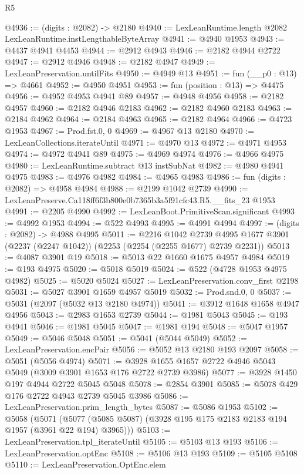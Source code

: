 \begin{lexlean}{R5}
\begin{coremodule}
@4936 := (digits : @2082) -> @2180
@4940 := LexLeanRuntime.length @2082 LexLeanRuntime.instLengthableByteArray
@4941 := @4940 @1953
@4943 := @4437 @4941 @4453
@4944 := @2912 @4943
@4946 := @2182 @4944 @2722
@4947 := @2912 @4946
@4948 := @2182 @4947
@4949 := LexLeanPreservation.untilFits
@4950 := @4949 @13
@4951 := fun (__p0 : @13) => @4661
@4952 := @4950 @4951
@4953 := fun (position : @13) => @4475
@4956 := @4952 @4953 @4941 @89
@4957 := @4948 @4956
@4958 := @2182 @4957
@4960 := @2182 @4946 @2183
@4962 := @2182 @4960 @2183
@4963 := @2184 @4962
@4964 := @2184 @4963
@4965 := @2182 @4964
@4966 := @4723 @1953
@4967 := Prod.fst.{0, 0}
@4969 := @4967 @13 @2180
@4970 := LexLeanCollections.iterateUntil
@4971 := @4970 @13
@4972 := @4971 @4953
@4974 := @4972 @4941 @89
@4975 := @4969 @4974
@4976 := @4966 @4975
@4980 := LexLeanRuntime.subtract @13 instSubNat
@4982 := @4980 @4941 @4975
@4983 := @4976 @4982
@4984 := @4965 @4983
@4986 := fun (digits : @2082) => @4958 @4984
@4988 := @2199 @1042 @2739
@4990 := LexLeanPreserve.Ca118ff6f3b800e0b7365b3a5f91cfc43.R5.__fits_23 @1953
@4991 := @2205 @4990
@4992 := LexLeanBoot.PrimitiveScan.significant
@4993 := @4992 @1953
@4994 := @522 @4993
@4995 := @4991 @4994
@4997 := (digits : @2082) -> @4988 @4995
@5011 := @2216
    @1042
    @2739
    @4995
    @1677
    @3901
    (@2237 (@2247 @1042))
    (@2253 (@2254 (@2255 @1677) @2739 @2231))
@5013 := @4087 @3901 @19
@5018 := @5013 @22 @1660 @1675 @4957 @4984
@5019 := @193 @4975
@5020 := @5018 @5019
@5024 := @522 (@4728 @1953 @4975 @4982)
@5025 := @5020 @5024
@5027 := LexLeanPreservation.conv_first @2198
@5031 := @5027 @3901 @1659 @4957 @5019
@5032 := Prod.snd.{0, 0}
@5037 := @5031 (@2097 (@5032 @13 @2180 @4974))
@5041 := @3912 @1648 @1658 @4947 @4956
@5043 := @2983 @1653 @2739
@5044 := @1981 @5043
@5045 := @193 @4941
@5046 := @1981 @5045
@5047 := @1981 @194
@5048 := @5047 @1957
@5049 := @5046 @5048
@5051 := @5041 (@5044 @5049)
@5052 := LexLeanPreservation.encPair
@5056 := @5052 @13 @2180 @193 @2097
@5058 := @5051 (@5056 @4974)
@5071 := @3928 @1655 @1657 @2722 @4946 @5043 @5049 (@3009 @3901 @1653 @176 @2722 @2739 @3986)
@5077 := @3928 @1450 @197 @4944 @2722 @5045 @5048
@5078 := @2854 @3901
@5085 := @5078 @429 @176 @2722 @4943 @2739 @5045 @3986
@5086 := LexLeanPreservation.prim_length_bytes
@5087 := @5086 @1953
@5102 := @5058
    (@5071 (@5077 (@5085 @5087) (@3928 @195 @175 @2183 @2183 @194 @1957 (@3961 @22 @194) @3965)))
@5103 := LexLeanPreservation.tpl_iterateUntil
@5105 := @5103 @13 @193
@5106 := LexLeanPreservation.optEnc
@5108 := @5106 @13 @193
@5109 := @5105 @5108
@5110 := LexLeanPreservation.OptEnc.elem

\end{coremodule}
\end{lexlean}
